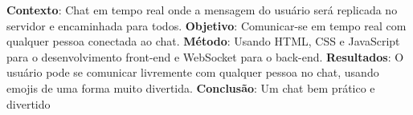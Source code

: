 
\centeredchapterstyle
\begin{resumo}
    \noindent\textbf{Contexto}:  Chat em tempo real onde a mensagem do usuário será replicada no servidor e encaminhada para todos.
 \textbf{Objetivo}: Comunicar-se em tempo real com qualquer pessoa conectada ao chat.  \textbf{Método}: Usando HTML, CSS e JavaScript para o desenvolvimento front-end e WebSocket para o back-end. \textbf{Resultados}: O usuário pode se comunicar livremente com qualquer pessoa no chat, usando emojis de uma forma muito divertida. \textbf{Conclusão}: Um chat bem prático e divertido
\end{resumo}